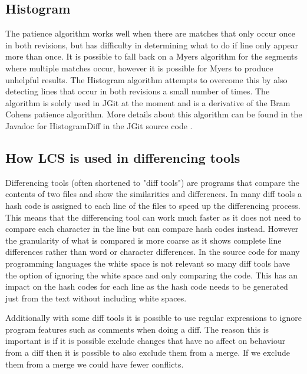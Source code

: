 \subsection{Histogram}
The patience algorithm works well when there are matches that only occur once in both revisions, but has difficulty in determining what to do if line only appear more than once.
It is possible to fall back on a Myers algorithm for the segments where multiple matches occur, however it is possible for Myers to produce unhelpful results. 
The Histogram algorithm attempts to overcome this by also detecting lines that occur in both revisions a small number of times.
The algorithm is solely used in JGit at the moment and is a derivative of the Bram Cohens patience algorithm. 
More details about this algorithm can be found in the Javadoc for HistogramDiff in the JGit source code \cite{Foundation2014}. 



\subsection{How LCS is used in differencing tools}
Differencing tools (often shortened to "diff tools") are programs that compare the contents of two files and show the similarities and differences.
In many diff tools a hash code is assigned to each line of the files to speed up the differencing process.
This means that the differencing tool can work much faster as it does not need to compare each character in the line but can compare hash codes instead.
However the granularity of what is compared is more coarse as it shows complete line differences rather than word or character differences. 
In the source code for many programming languages the white space is not relevant so many diff tools have the option of ignoring the white space and only comparing the code.
This has an impact on the hash codes for each line as the hash code needs to be generated just from the text without including white spaces.

Additionally with some diff tools it is possible to use regular expressions to ignore program features such as comments when doing a diff.  The reason this is important is if it is possible exclude changes that have no affect on behaviour from a diff then it is possible to also exclude them from a merge.  If we exclude them from a merge we could have fewer conflicts.

